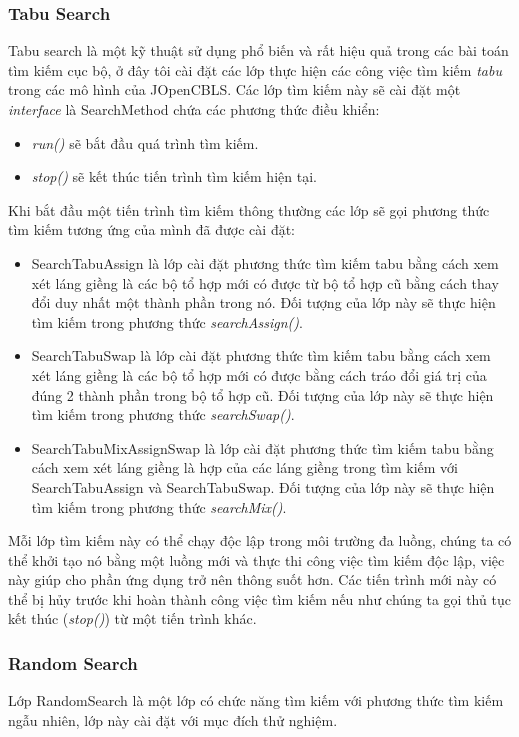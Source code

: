 \subsubsection{Tabu Search}
Tabu search là một kỹ thuật sử dụng phổ biến và rất hiệu quả trong các bài toán tìm kiếm cục bộ, ở đây tôi cài đặt các lớp thực hiện các công việc tìm kiếm \textit{tabu} trong các mô hình của JOpenCBLS. Các lớp tìm kiếm này sẽ cài đặt một \textit{interface} là \textsf{SearchMethod} chứa các phương thức điều khiển:
\begin{itemize}
	\item \textit{run()} sẽ bắt đầu quá trình tìm kiếm.
	\item \textit{stop()} sẽ kết thúc tiến trình tìm kiếm hiện tại.
\end{itemize}
Khi bắt đầu một tiến trình tìm kiếm thông thường các lớp sẽ gọi phương thức tìm kiếm tương ứng của mình đã được cài đặt:
\begin{itemize}
	\item \textsf{SearchTabuAssign} là lớp cài đặt phương thức tìm kiếm tabu bằng cách xem xét láng giềng là các bộ tổ hợp mới có được từ bộ tổ hợp cũ bằng cách thay đổi duy nhất một thành phần trong nó. Đối tượng của lớp này sẽ thực hiện tìm kiếm trong phương thức \textit{searchAssign()}.
	\item \textsf{SearchTabuSwap} là lớp cài đặt phương thức tìm kiếm tabu bằng cách xem xét láng giềng là các bộ tổ hợp mới có được bằng cách tráo đổi giá trị của đúng 2 thành phần trong bộ tổ hợp cũ. Đối tượng của lớp này sẽ thực hiện tìm kiếm trong phương thức \textit{searchSwap()}.
	\item \textsf{SearchTabuMixAssignSwap} là lớp cài đặt phương thức tìm kiếm tabu bằng cách xem xét láng giềng là hợp của các láng giềng trong tìm kiếm với \textsf{SearchTabuAssign} và \textsf{SearchTabuSwap}. Đối tượng của lớp này sẽ thực hiện tìm kiếm trong phương thức \textit{searchMix()}.
\end{itemize}

Mỗi lớp tìm kiếm này có thể chạy độc lập trong môi trường đa luồng, chúng ta có thể khởi tạo nó bằng một luồng mới và thực thi công việc tìm kiếm độc lập, việc này giúp cho phần ứng dụng trở nên thông suốt hơn. Các tiến trình mới này có thể bị hủy trước khi hoàn thành công việc tìm kiếm nếu như chúng ta gọi thủ tục kết thúc (\textit{stop()}) từ một tiến trình khác.

\subsubsection{Random Search}
Lớp \textsf{RandomSearch} là một lớp có chức năng tìm kiếm với phương thức tìm kiếm ngẫu nhiên, lớp này cài đặt với mục đích thử nghiệm.
